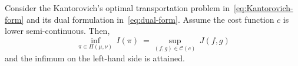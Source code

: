 \documentclass[10pt]{article}
\newcommand{\real}{\mathbb{R}}
\newcommand{\calC}{\mathcal{C}}
\numberwithin{equation}{section}
\begin{document}
\begin{theorem}\cite[Theorem 1.3]{villani2003topics}\label{thm:duality}
	Consider the Kantorovich's optimal transportation problem in~\eqref{eq:Kantorovich-form} and its dual formulation in~\eqref{eq:dual-form}. Assume the cost function $c$ is lower semi-continuous. Then, 
	\begin{equation*}
	\inf_{\pi\in\Pi(\mu,\nu)}\, I(\pi) ~= \sup_{(f,g)\in\calC(c)}\, J(f,g)
	\end{equation*}
	and the infimum on the left-hand side is attained.
\end{theorem}
\end{document}
